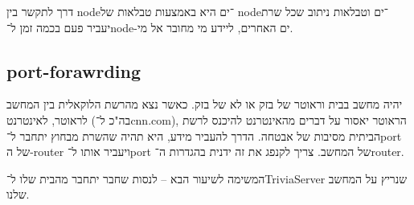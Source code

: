 \documentclass[]{article}
\begin{document}
	דרך לתקשר בין node־ים  היא באמצעות טבלאות של node־ים וטבלאות ניתוב שכל שרת יעביר פעם בכמה זמן ל־node-ים האחרים, ליידע מי מחובר אל מי. 
	
	\subsection{port-forawrding}
	יהיה מחשב בבית וראוטר של בזק או לא של בזק. כאשר נצא מהרשת הלוקאלית בין המחשב לראוטר, לאינטרנט (בה"כ ל־cnn.com), הראוטר יאסור על דברים מהאינטרנט להיכנס לרשת הביתית מסיבות של אבטחה. הדרך להעביר מידע, היא תהיה שהשרת מבחוץ יתחבר ל־port של ה-router ויעביר אותו ל־port של המחשב. צריך לקנפג את זה ידנית בהגדרות ה־router. 
	
	המשימה לשיעור הבא – לנסות שחבר יתחבר מהבית שלו ל־TriviaServer שנריץ על המחשב שלנו. 
	
\end{document}
